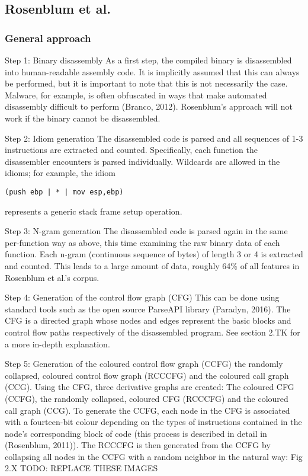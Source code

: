 \documentclass[a4paper,11pt]{kth-mag}
\begin{document}
\subsection{Rosenblum et al.}
\subsubsection{General approach}
Step 1: Binary disassembly
As a first step, the compiled binary is disassembled into human-readable
assembly code. It is implicitly assumed that this can always be performed, but
it is important to note that this is not necessarily the case. Malware, for
example, is often obfuscated in ways that make automated disassembly difficult
to perform (Branco, 2012). Rosenblum’s approach will not work if the binary
cannot be disassembled.

Step 2: Idiom generation
The disassembled code is parsed and all sequences of 1-3 instructions are
extracted and counted. Specifically, each function the disassembler encounters
is parsed individually. Wildcards are allowed in the idioms; for example, the
idiom
\begin{lstlisting}
(push ebp | * | mov esp,ebp)
\end{lstlisting}
represents a generic stack frame setup operation.

Step 3: N-gram generation
The disassembled code is parsed again in the same per-function way as above,
this time examining the raw binary data of each function. Each n-gram
(continuous sequence of bytes) of length 3 or 4 is extracted and counted. This
leads to a large amount of data, roughly 64\% of all features in Rosenblum et
al.’s corpus.

Step 4: Generation of the control flow graph (CFG)
This can be done using standard tools such as the open source ParseAPI library
(Paradyn, 2016). The CFG is a directed graph whose nodes and edges represent
the basic blocks and control flow paths respectively of the disassembled
program. See section 2.TK for a more in-depth explanation.

Step 5: Generation of the coloured control flow graph (CCFG) the randomly
collapsed, coloured control flow graph (RCCCFG) and the coloured call graph
(CCG).
Using the CFG, three derivative graphs are created: The coloured CFG (CCFG),
the randomly collapsed, coloured CFG (RCCCFG) and the coloured call graph
(CCG). To generate the CCFG, each node in the CFG is associated with a
fourteen-bit colour depending on the types of instructions contained in the
node’s corresponding block of code (this process is described in detail in
(Rosenblum, 2011)). The RCCCFG is then generated from the CCFG by collapsing
all nodes in the CCFG with a random neighbor in the natural way:
Fig 2.X TODO: REPLACE THESE IMAGES
\end{document}
